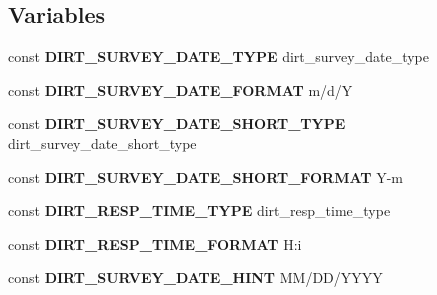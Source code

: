 \subsection*{Variables}
\begin{DoxyCompactItemize}
\item 
\mbox{\label{dirt_8module_a4bec9c73b5aa305f5fbb8e9dbd5563fe}} 
const {\bfseries D\+I\+R\+T\+\_\+\+S\+U\+R\+V\+E\+Y\+\_\+\+D\+A\+T\+E\+\_\+\+T\+Y\+PE} \textquotesingle{}dirt\+\_\+survey\+\_\+date\+\_\+type\textquotesingle{}
\item 
\mbox{\label{dirt_8module_acb69ff19c735d84893e4d424cee9cf6f}} 
const {\bfseries D\+I\+R\+T\+\_\+\+S\+U\+R\+V\+E\+Y\+\_\+\+D\+A\+T\+E\+\_\+\+F\+O\+R\+M\+AT} \textquotesingle{}m/d/Y\textquotesingle{}
\item 
\mbox{\label{dirt_8module_a4758bb0f2517e04bcc0b372570713e63}} 
const {\bfseries D\+I\+R\+T\+\_\+\+S\+U\+R\+V\+E\+Y\+\_\+\+D\+A\+T\+E\+\_\+\+S\+H\+O\+R\+T\+\_\+\+T\+Y\+PE} \textquotesingle{}dirt\+\_\+survey\+\_\+date\+\_\+short\+\_\+type\textquotesingle{}
\item 
\mbox{\label{dirt_8module_ada1b425ff0bb4dec61bafae245b0dc0a}} 
const {\bfseries D\+I\+R\+T\+\_\+\+S\+U\+R\+V\+E\+Y\+\_\+\+D\+A\+T\+E\+\_\+\+S\+H\+O\+R\+T\+\_\+\+F\+O\+R\+M\+AT} \textquotesingle{}Y-\/m\textquotesingle{}
\item 
\mbox{\label{dirt_8module_a99efa6086d2986700b77a8412c536d83}} 
const {\bfseries D\+I\+R\+T\+\_\+\+R\+E\+S\+P\+\_\+\+T\+I\+M\+E\+\_\+\+T\+Y\+PE} \textquotesingle{}dirt\+\_\+resp\+\_\+time\+\_\+type\textquotesingle{}
\item 
\mbox{\label{dirt_8module_a8f7e361303f5cf6b8e72db0e901b8845}} 
const {\bfseries D\+I\+R\+T\+\_\+\+R\+E\+S\+P\+\_\+\+T\+I\+M\+E\+\_\+\+F\+O\+R\+M\+AT} \textquotesingle{}H\+:i\textquotesingle{}
\item 
\mbox{\label{dirt_8module_ab3293f1172b24eb903b3e8d728dc1f07}} 
const {\bfseries D\+I\+R\+T\+\_\+\+S\+U\+R\+V\+E\+Y\+\_\+\+D\+A\+T\+E\+\_\+\+H\+I\+NT} \textquotesingle{}MM/DD/Y\+Y\+YY\textquotesingle{}
\item 
\mbox{\label{dirt_8module_a6f4bb65a8c5b2d6797e45c0d526eb98e}} 

\end{DoxyCompactItemize}

